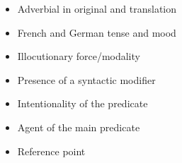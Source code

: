 \begin{itemize}[noitemsep]
\item Adverbial in original and translation %
\item French and German tense and mood %
\item Illocutionary force/modality%
\item Presence of a syntactic modifier%
\item Intentionality of the predicate%
\item Agent of the main predicate%
\item Reference point%
\end{itemize}
%


